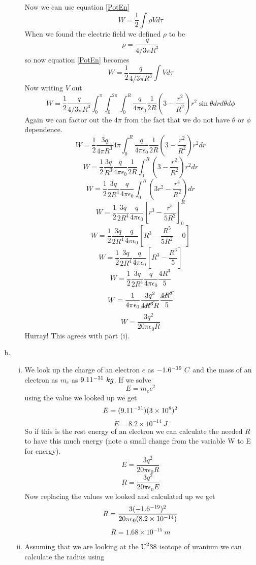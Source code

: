 \documentclass[11pt]{article}
\numberwithin{equation}{section}
\begin{document}
\begin{enumerate}[(a)]
\begin{enumerate}[(i)]

Now we can use equation \ref{PotEn}
$$W = \frac{1}{2}\int\rho Vd\tau$$
When we found the electric field we defined $\rho$ to be
$$\rho = \frac{q}{4/3\pi R^3}$$
so now equation \ref{PotEn} becomes
$$W = \frac{1}{2}\frac{q}{4/3\pi R^3}\int Vd \tau$$
Now writing $V$ out 
$$W = \frac{1}{2}\frac{q}{4/3\pi R^3}\int_0^{\pi}\int_0^{2\pi}\int_0^{R}\frac{q}{4\pi\epsilon_0} \frac{1}{2R}\left(3-\frac{r^2}{R^2}\right)r^2\sin{\theta}drd\theta d\phi$$
Again we can factor out the $4\pi$ from the fact that we do not have $\theta$ or $\phi$ dependence.
$$W = \frac{1}{2}\frac{3q}{4\pi R^3}4\pi\int_0^{R}\frac{q}{4\pi\epsilon_0} \frac{1}{2R}\left(3-\frac{r^2}{R^2}\right)r^2dr$$
$$W = \frac{1}{2}\frac{3q}{R^3}\frac{q}{4\pi\epsilon_0}\frac{1}{2R}\int_0^{R}\left(3-\frac{r^2}{R^2}\right)r^2dr$$
$$W = \frac{1}{2}\frac{3q}{2R^4}\frac{q}{4\pi\epsilon_0}\int_0^{R}\left(3r^2-\frac{r^4}{R^2}\right)dr$$
$$W = \frac{1}{2}\frac{3q}{2R^4}\frac{q}{4\pi\epsilon_0}\left[r^3-\frac{r^5}{5R^2}\right]_0^R$$
$$W = \frac{1}{2}\frac{3q}{2R^4}\frac{q}{4\pi\epsilon_0}\left[R^3-\frac{R^5}{5R^2} - 0\right]$$
$$W = \frac{1}{2}\frac{3q}{2R^4}\frac{q}{4\pi\epsilon_0}\left[R^3-\frac{R^3}{5} \right]$$
$$W = \frac{1}{2}\frac{3q}{2R^4}\frac{q}{4\pi\epsilon_0}\frac{4R^3}{5}$$
$$W = \frac{1}{4\pi\epsilon_0}\frac{3q^2}{\cancel{4R^3}R}\frac{\cancel{4R^3}}{5}$$
$$W = \frac{3q^2}{20\pi\epsilon_0R}$$
Hurray! This agrees with part (i).

\end{enumerate}
\item
\begin{enumerate}[(i)]
\item
We look up the charge of an electron $e$ as $-1.6\time10^{-19}\ C$ and the mass of an electron as $m_e$ as $9.11\time10^{-31}\ kg$. If we solve $$E=m_ec^2$$ using the value we looked up we get
$$E= (9.11\time10^{-31})(3\times10^8)^2$$ 
$$E= 8.2\times10^{-14}\ J$$
So if this is the rest energy of an electron we can calculate the needed $R$ to have this much energy (note a small change from the variable W to E for energy).
$$E = \frac{3q^2}{20\pi\epsilon_0R}$$
$$R = \frac{3q^2}{20\pi\epsilon_0E}$$
Now replacing the values we looked and calculated up we get
$$R = \frac{3(-1.6\time10^{-19})^2}{20\pi\epsilon_0(8.2\times10^{-14})}$$
$$R = 1.68\times10^{-15}\ m$$
\item
Assuming that we are looking at the $\textnormal{U}^238$ isotope of uranium we can calculate the radius using


\end{enumerate}
\end{enumerate}
\end{document}
